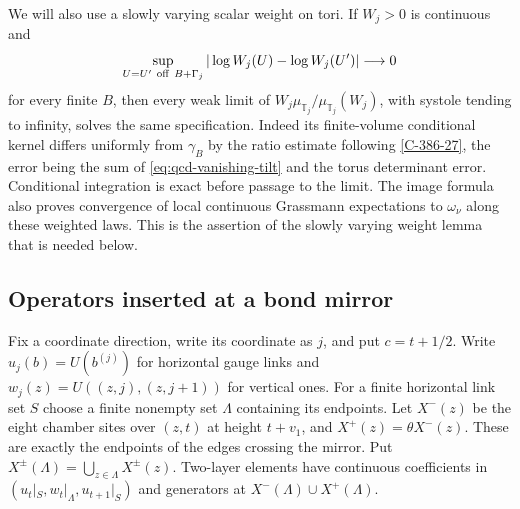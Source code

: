 \documentclass[11pt,letterpaper,reqno]{amsart}
\theoremstyle{definition}
\theoremstyle{remark}
\begin{document}
We will also use a slowly varying scalar weight on tori. If
$W_j>0$ is continuous and
\begin{equation}\label{eq:qcd-vanishing-tilt}
 \sup_{U=U'\ {\rm off}\ B+\Gamma_j}
                |\log W_j(U)-\log W_j(U')|\longrightarrow0
\end{equation}
for every finite $B$, then every weak limit of
$W_j\mu_{\mathbb T_j}/\mu_{\mathbb T_j}(W_j)$, with systole
tending to infinity, solves the same specification. Indeed its
finite-volume conditional kernel differs uniformly from $\gamma_B$
by the ratio estimate following \cref{C-386-27}, the error being
the sum of \eqref{eq:qcd-vanishing-tilt} and the torus determinant
error. Conditional integration is exact before passage to the limit.
The image formula also proves convergence of local continuous
Grassmann expectations to $\omega_\nu$ along these weighted laws.
This is the assertion of \label{C-386-28}the slowly varying weight
lemma that is needed below.

\subsection{Operators inserted at a bond mirror}

Fix a coordinate direction, write its coordinate as $j$, and put
$c=t+1/2$. Write $u_j(b)=U(b^{(j)})$ for horizontal gauge links
and $w_j(z)=U((z,j),(z,j+1))$ for vertical ones. For a finite
horizontal link set $S$ choose a finite nonempty set $\Lambda$
containing its endpoints. Let $X^-(z)$ be the eight chamber sites
over $(z,t)$ at height $t+v_1$, and $X^+(z)=\theta X^-(z)$.
These are exactly the endpoints of the edges crossing the mirror.
Put $X^\pm(\Lambda)=\bigcup_{z\in\Lambda}X^\pm(z)$.
Two-layer elements have continuous coefficients in
$(u_t|_S,w_t|_\Lambda,u_{t+1}|_S)$ and generators at
$X^-(\Lambda)\cup X^+(\Lambda)$.
\end{document}
